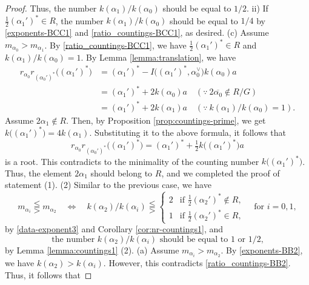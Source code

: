 \documentclass[11pt]{amsart}
\begin{document}
{{\begin{proof}
Thus, the number $k(\alpha_1)/k(\alpha_0)$ should be equal to $1/2$. 
\vskip 1mm
\noindent
ii) If $\tfrac12 (\alpha_1')^\ast\in R$, the number $k(\alpha_1)/k(\alpha_0)$ 
should be equal to $1/4$ by \eqref{exponents-BCC1} and
\eqref{ratio_countings-BCC1}, as desired.
\vskip 3mm
\noindent
(c) Assume $m_{\alpha_0}>m_{\alpha_1}$. By \eqref{ratio_countings-BCC1}, we have
$\tfrac12 (\alpha_1')^\ast\in R$ and $k(\alpha_1)/k(\alpha_0)=1$. By Lemma 
\ref{lemma:translation}, we have
\begin{align*}
r_{\alpha_0}r_{(\alpha_0')^\ast}\big((\alpha_1')^\ast\big)
&=(\alpha_1')^\ast-I\big((\alpha_1')^\ast,\alpha_0^\vee\big)k(\alpha_0)a\\
&=(\alpha_1')^\ast+2k(\alpha_0)a\quad (\because\ 2\overline{\alpha_0}\not\in R/G)\\
&=(\alpha_1')^\ast+2 k(\alpha_1)a\quad (\because\ k(\alpha_1)/k(\alpha_0)=1).
\end{align*}
Assume $2\alpha_1\not\in R$. Then, by Proposition \ref{prop:countings-prime}, we
get  $k\big((\alpha_1')^\ast\big)=4k(\alpha_1)$. Substituting it to the above formula, 
it follows that
\[ r_{\alpha_0}r_{(\alpha_0')^\ast}
\big((\alpha_1')^\ast\big)=(\alpha_1')^\ast+\tfrac12 k\big((\alpha_1')^\ast\big)a\]
is a root. This contradicts to the minimality of the counting number 
$k\big((\alpha_1')^\ast\big)$. Thus, the element $2\alpha_1$ should 
{belong} to $R$, 
and we completed  the proof of statement (1).
\vskip 3mm
\noindent
(2) %
Similar to the previous case, we have
\begin{equation}\label{exponents-BB2}
m_{\alpha_i}\lesseqqgtr m_{\alpha_2}\quad \Longleftrightarrow\quad
k(\alpha_2)/k(\alpha_i)\lesseqqgtr \begin{cases}
2 & \text{if }\tfrac12 (\alpha_2')^\ast\not\in R,\\
1 & \text{if }\tfrac12 (\alpha_2')^\ast\in R,
\end{cases}
\quad \text{for }i=0,1,
\end{equation}
by \eqref{data-exponent3} and Corollary \ref{cor:nr-countings1}, and 
\begin{equation}\label{ratio_countings-BB2}
\text{the number $k(\alpha_2)/k(\alpha_i)$ should be equal to $1$ or $1/2$,} 
\end{equation}
by Lemma \ref{lemma:countings1} (2). 
\vskip 3mm
\noindent
(a) Assume $m_{\alpha_i}>m_{\alpha_2}$. 
By \eqref{exponents-BB2}, we have $k(\alpha_2)>k(\alpha_i)$. However, this 
contradicts \eqref{ratio_countings-BB2}. Thus, it follows that 

\end{proof}}}
\end{document}
